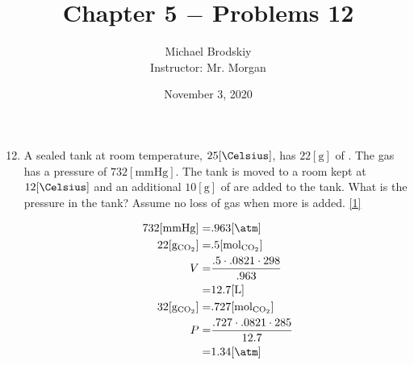 \documentclass[12pt]{article}
\title{Chapter 5 $-$ Problems 12}
\date{November 3, 2020}
\author{Michael Brodskiy\\ \small Instructor: Mr. Morgan}
\begin{document}
\maketitle

\begin{enumerate}

    \setcounter{enumi}{11}

  \item A sealed tank at room temperature, $25[\si{\Celsius}]$, has $22[\si{\gram}]$ of . The gas has a pressure of $732[\si{\mmHg}]$. The tank is moved to a room kept at $12[\si{\Celsius}]$ and an additional $10[\si{\gram}]$ of  are added to the tank. What is the pressure in the tank? Assume no loss of gas when more  is added. \eqref{1}

    \begin{equation}
      \begin{split}
        732[\si{\mmHg}]=&.963[\si{\atm}]\\
        22[\si{\gram}_{\ce{CO2}}]=&.5[\si{\mole}_{\ce{CO2}}]\\
        V=&\frac{.5\cdot.0821\cdot298}{.963}\\
        =&12.7[\si{\liter}]\\
        32[\si{\gram}_{\ce{CO2}}]=&.727[\si{\mole}_{\ce{CO2}}]\\
        P=&\frac{.727\cdot.0821\cdot285}{12.7}\\
        =&1.34[\si{\atm}]
      \end{split}
      \label{1}
    \end{equation}

\end{enumerate}
\end{document}
